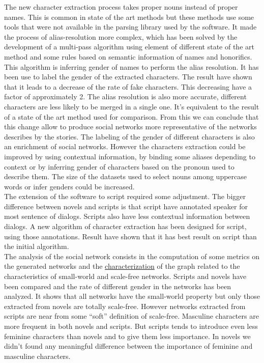 \documentclass[a4paper, 12pt]{report}
\begin{document}
The new character extraction process takes proper nouns instead of proper names. This is common in state of the art methods but these methods use some tools that were not available in the parsing library used by the software. It made the process of alias-resolution more complex, which has been solved by the development of a multi-pass algorithm using element of different state of the art method and some rules based on semantic information of names and honorifics. This algorithm is inferring gender of names to perform the alias resolution. It has been use to label the gender of the extracted characters.
The result have shown that it leads to a decrease of the rate of fake characters. This decreasing have a factor of approximately 2. The alias resolution is also more accurate, different characters are less likely to be merged in a single one.
It's equivalent to the result of a state of the art method used for comparison.
 From this we can conclude that this change allow to produce social networks more representative of the networks describes by the stories. The labeling of the gender of different characters is also an enrichment of social networks.
 However the characters extraction could be improved by using contextual information, by binding some aliases depending to context or by inferring gender of characters based on the pronoun used to describe them. 
 The size of the datasets used to select nouns among uppercase words or infer genders could be increased.\\
 
 The extension of the software to script required some adjustment. The bigger difference between novels and scripts is that  script have annotated speaker for most sentence of dialogs. Scripts also have less contextual information between dialogs.
 A new algorithm of character extraction has been designed for script, using those annotations. Result have shown that it has best result on script than the initial algorithm. \\
 
The analysis of the social network consists in the computation of some metrics on the generated networks and the \hyperref[char]{characterization} of the graph related to the characteristics of small-world and scale-free networks. Scripts and novels have been compared and the rate of different gender in the networks has been analyzed. It shows that all networks have the small-world property but only those extracted from novels are totally scale-free. However networks extracted from scripts are near from some ``soft'' definition of scale-free. Masculine characters are more frequent in both novels and scripts. But scripts tends to introduce even less feminine characters than novels and to give them less importance. In novels we didn't found any meaningful difference between the importance of feminine and masculine characters.
\end{document}
